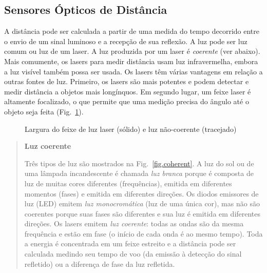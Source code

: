 \subsection{Sensores Ópticos de Distância}\label{s.optical-distance}

A distância pode ser calculada a partir de uma medida do tempo decorrido entre o envio de um sinal luminoso e a recepção de sua reflexão. A luz pode ser luz comum ou luz de um laser. A luz produzida por um laser é \emph{coerente} (ver abaixo).  Mais comumente, os lasers para medir distância usam luz infravermelha, embora a luz visível também possa ser usada. Os lasers têm várias vantagens em relação a outras fontes de luz. Primeiro, os lasers são mais potentes e podem detectar e medir distância a objetos mais longínquos. Em segundo lugar, um feixe laser é altamente focalizado, o que permite que uma medição precisa do ângulo até o objeto seja feita (Fig.~\ref{fig.beam}).

\begin{figure}
\begin{center}
\end{center}
\caption{Largura do feixe de luz laser (sólido) e luz não-coerente (tracejado)}\label{fig.beam}
\end{figure}

\begin{quote}
\begin{center}
\textbf{Luz coerente}
\end{center}
Três tipos de luz são mostrados na Fig.~\ref{fig.coherent}. A luz do sol ou de uma lâmpada incandescente é chamada \emph{luz branca} porque é composta de luz de muitas cores diferentes (frequências), emitida em diferentes momentos (fases) e emitida em diferentes direções. Os diodos emissores de luz (LED) emitem \emph{luz monocromática} (luz de uma única cor), mas não são coerentes porque suas fases são diferentes e sua luz é emitida em diferentes direções. Os lasers emitem \emph{luz coerente}: todas as ondas são da mesma frequência e estão em fase (o início de cada onda é ao mesmo tempo). Toda a energia é concentrada em um feixe estreito e a distância pode ser calculada medindo seu tempo de voo (da emissão à detecção do sinal refletido) ou a diferença de fase da luz refletida.
\end{quote}

